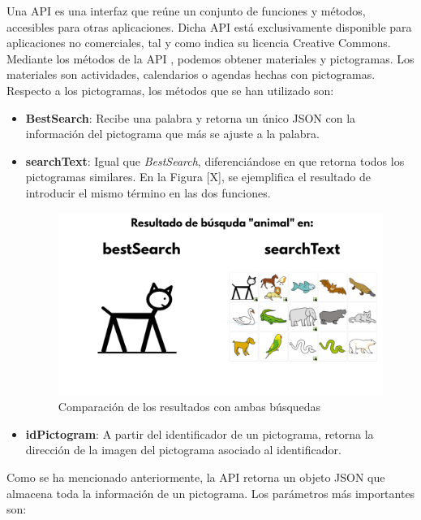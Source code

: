 Una API es una interfaz que reúne un conjunto de funciones y métodos, accesibles para otras aplicaciones. Dicha API está exclusivamente disponible para aplicaciones no comerciales, tal y como indica su licencia Creative Commons.
Mediante los métodos de la API , podemos obtener materiales y pictogramas. Los materiales  son actividades, calendarios o agendas hechas con pictogramas. Respecto a los pictogramas, los métodos que se han utilizado son:
\begin{itemize}
	\item \textbf{BestSearch}: Recibe una palabra y retorna un único JSON con la información del pictograma que más se ajuste a la palabra.
	
	\item \textbf{searchText}: Igual que \textit{BestSearch}, diferenciándose en que retorna todos los pictogramas similares. En la Figura [X], se ejemplifica el resultado de introducir el mismo término en las dos funciones.
	
	 \begin{figure}[h!]
	 	\centering
	 	\includegraphics[width=0.8\linewidth]{Imagenes/Bitmap/techComparacionBusquedas}
	 	\caption{Comparación de los resultados con ambas búsquedas}
	 	\label{fig:compBusq}
	 \end{figure}
	
	\item \textbf{idPictogram}: A partir del identificador de un pictograma, retorna la dirección de la imagen del pictograma asociado al identificador.    
\end{itemize}


Como se ha mencionado anteriormente, la API retorna un objeto JSON que almacena toda la información de un pictograma. Los parámetros más importantes son: 



